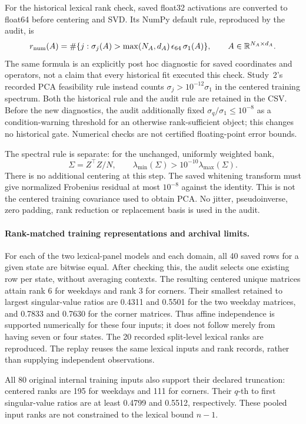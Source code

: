For the historical lexical rank check, saved float32 activations are converted to float64 before centering and SVD. Its NumPy default rule, reproduced by the audit, is
\[
 r_{\mathrm{num}}(A)
 =\#\{j:\sigma_j(A)>\max(N_A,d_A)\,\epsilon_{64}\,\sigma_1(A)\},
 \qquad A\in\mathbb{R}^{N_A\times d_A}.
\]
The same formula is an explicitly post hoc diagnostic for saved coordinates and operators, not a claim that every historical fit executed this check. Study~2's recorded PCA feasibility rule instead counts $\sigma_j>10^{-12}\sigma_1$ in the centered training spectrum. Both the historical rule and the audit rule are retained in the CSV. Before the new diagnostics, the audit additionally fixed $\sigma_q/\sigma_1\le10^{-8}$ as a condition-warning threshold for an otherwise rank-sufficient object; this changes no historical gate. Numerical checks are not certified floating-point error bounds.

The spectral rule is separate: for the unchanged, uniformly weighted bank,
\[
 \Sigma=Z^\top Z/N,\qquad
 \lambda_{\min}(\Sigma)>10^{-10}\lambda_{\max}(\Sigma).
\]
There is no additional centering at this step. The saved whitening transform must give normalized Frobenius residual at most $10^{-8}$ against the identity. This is not the centered training covariance used to obtain PCA. No jitter, pseudoinverse, zero padding, rank reduction or replacement basis is used in the audit.

\paragraph{Rank-matched training representations and archival limits.}
For each of the two lexical-panel models and each domain, all 40 saved rows for a given state are bitwise equal. After checking this, the audit selects one existing row per state, without averaging contexts. The resulting centered unique matrices attain rank 6 for weekdays and rank 3 for corners. Their smallest retained to largest singular-value ratios are 0.4311 and 0.5501 for the two weekday matrices, and 0.7833 and 0.7630 for the corner matrices. Thus affine independence is supported numerically for these four inputs; it does not follow merely from having seven or four states. The 20 recorded split-level lexical ranks are reproduced. The replay reuses the same lexical inputs and rank records, rather than supplying independent observations.

All 80 original internal training inputs also support their declared truncation: centered ranks are 195 for weekdays and 111 for corners. Their $q$-th to first singular-value ratios are at least 0.4799 and 0.5512, respectively. These pooled input ranks are not constrained to the lexical bound $n-1$.

